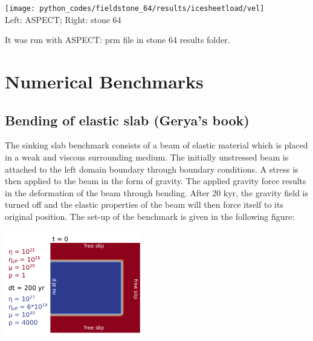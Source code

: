 \begin{center}
\texttt{[image: python\_codes/fieldstone\_64/results/icesheetload/vel]}\\
{\captionfont Left: ASPECT; Right: stone 64} 
\end{center}


It was run with ASPECT: prm file in stone 64 results folder.










\section{Numerical Benchmarks}

\subsection{Bending of elastic slab (Gerya's book)}

The sinking slab benchmark consists of a beam of elastic material which is placed 
in a weak and viscous surrounding medium. The initially unstressed beam is attached to the left domain boundary through boundary conditions. A stress is then applied to the beam in the form of gravity. The applied gravity force results in the deformation of the beam through bending. After 20 kyr, the gravity field is turned off and the elastic properties of the beam will then force itself to its original position. The set-up of the benchmark is given in the following figure:

\begin{center}
\includegraphics[width=6cm]{images/viscoelasticity/poster_benchmark.png}\\
\end{center}

